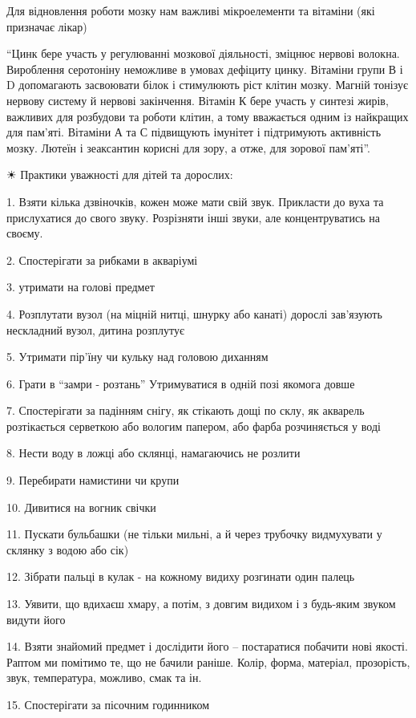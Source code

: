 Для відновлення роботи мозку нам важливі мікроелементи та вітаміни (які призначає лікар)

\enquote{Цинк бере участь у регулюванні мозкової діяльності, зміцнює нервові волокна.
Вироблення серотоніну неможливе в умовах дефіциту цинку. Вітаміни групи В і D
допомагають засвоювати білок і стимулюють ріст клітин мозку. Магній тонізує
нервову систему й нервові закінчення. Вітамін К бере участь у синтезі жирів,
важливих для розбудови та роботи клітин, а тому вважається одним із найкращих
для пам'яті. Вітаміни А та С підвищують імунітет і підтримують активність
мозку. Лютеїн і зеаксантин корисні для зору, а отже, для зорової пам'яті}.

☀ Практики уважності для дітей та дорослих:

1. Взяти кілька дзвіночків, кожен може мати свій звук. Прикласти до вуха та
прислухатися до свого звуку. Розрізняти інші звуки, але концентруватись на
своєму.

2. Спостерігати за рибками в акваріумі

3. утримати на голові предмет

4. Розплутати вузол (на міцній нитці, шнурку або канаті) дорослі зав'язують
нескладний вузол, дитина розплутує

5. Утримати пір'їну чи кульку над головою диханням

6. Грати в \enquote{замри - розтань} Утримуватися в одній позі якомога довше

7. Спостерігати за падінням снігу, як стікають дощі по склу, як акварель
розтікається серветкою або вологим папером, або фарба розчиняється у воді

8. Нести воду в ложці або склянці, намагаючись не розлити

9. Перебирати намистини чи крупи

10. Дивитися на вогник свічки

11. Пускати бульбашки (не тільки мильні, а й через трубочку видмухувати у
склянку з водою або сік)

12. Зібрати пальці в кулак - на кожному видиху розгинати один палець

13. Уявити, що вдихаєш хмару, а потім, з довгим видихом і з будь-яким звуком
видути його

14. Взяти знайомий предмет і дослідити його – постаратися побачити нові якості.
Раптом ми помітимо те, що не бачили раніше. Колір, форма, матеріал, прозорість,
звук, температура, можливо, смак та ін.

15. Спостерігати за пісочним годинником

